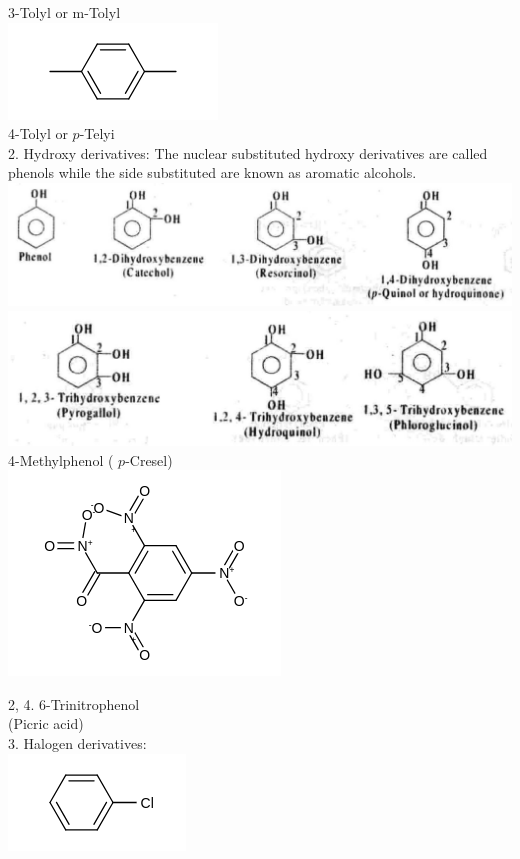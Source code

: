 \documentclass[10pt]{article}
\begin{document}
3-Tolyl or m-Tolyl\\
\includegraphics{smile-bb6291c4d745b6e34762637589268f3d7ecad7ad}\\
4-Tolyl or $p$-Telyi\\
2. Hydroxy derivatives: The nuclear substituted hydroxy derivatives are called phenols while the side substituted are known as aromatic alcohols.\\
\includegraphics[max width=\textwidth, center]{2025_01_28_8470952b98110cec3aabg-029(1)}\\
\includegraphics[max width=\textwidth, center]{2025_01_28_8470952b98110cec3aabg-029}\\
4-Methylphenol ( $p$-Cresel)\\
\includegraphics{smile-7179093be0fabceb5ae40c76ac22c106fc5f7a48}

2, 4. 6-Trinitrophenol\\
(Picric acid)\\
3. Halogen derivatives:\\
\includegraphics{smile-a5d0d5ed92ab7e860bd7cbf63516222d4983ad3c}
\end{document}
